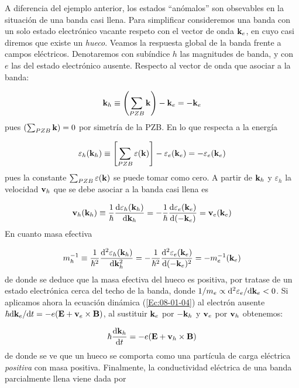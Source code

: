 A diferencia del ejemplo anterior, los estados ``anómalos'' son obsevables en la situación de una banda casi llena. Para simplificar consideremos una banda con un solo estado electrónico vacante respeto con el vector de onda $\mathbf{k}_e$, en cuyo casi diremos que existe un \textit{hueco}. Veamos la respuesta global de la banda frente a campos eléctricos. Denotaremos con subíndice $h$ las magnitudes de banda, y con $e$ las del estado electrónico ausente. Respecto al vector de onda que asociar a la banda:

\begin{equation}
	\mathbf{k}_h \equiv \left( \sum_{PZB} \mathbf{k} \right) - \mathbf{k}_e = - \mathbf{k}_e
\end{equation}
pues $\left( \sum_{PZB} \mathbf{k} \right) =0$ por simetría de la PZB. En lo que respecta a la energía 

\begin{equation}
	\varepsilon_h (\mathbf{k}_h) \equiv \left[ \sum_{PZB} \varepsilon(\mathbf{k})  \right] - \varepsilon_e (\mathbf{k}_e) = - \varepsilon_e (\mathbf{k}_e)
\end{equation}
pues la constante $\sum_{PZB} \varepsilon(\mathbf{k})$ se puede tomar como cero. A partir de $\mathbf{k}_h$ y $\varepsilon_h$ la velocidad $\mathbf{v}_h$ que se debe asociar a la banda casi llena es 
 
\begin{equation}
	\mathbf{v}_h (\mathbf{k}_h) \equiv \frac{1}{\hbar} \frac{\mathrm{d} \varepsilon_h (\mathbf{k}_h)}{\mathrm{d} \mathbf{k}_h} = - \frac{1}{\hbar} \frac{\mathrm{d} \varepsilon_e (\mathbf{k}_e)}{\mathrm{d} (-\mathbf{k}_e)} = \mathbf{v}_e (\mathbf{k}_e)
\end{equation}
En cuanto masa efectiva

\begin{equation}
	m_h^{-1} \equiv \frac{1}{\hbar^2} \frac{\mathrm{d} ^2\varepsilon_h (\mathbf{k}_h)}{\mathrm{d} \mathbf{k}_h^2} = - \frac{1}{\hbar^2} \frac{\mathrm{d} ^2\varepsilon_e (\mathbf{k}_e)}{\mathrm{d} (-\mathbf{k}_e)^2} = - m_e^{-1}(\mathbf{k}_e)
\end{equation}
de donde se deduce que la masa efectiva del hueco es positiva, por tratase de un estado electrónica cerca del techo de la banda, donde $1/m_e \propto \mathrm{d}^2 \varepsilon_e / \mathrm{d} \mathbf{k}_e <0$. Si aplicamos ahora la ecuación dinámica (\ref{Ec:08-01-04}) al electrón ausente $\hbar \mathrm{d} \mathbf{k}_e / \mathrm{d} t = - e (\mathbf{E} + \mathbf{v}_e \times \mathbf{B})$, al sustituir $\mathbf{k}_e$ por $-\mathbf{k}_h$ y $\mathbf{v}_e$ por $\mathbf{v}_h$ obtenemos:

\begin{equation}
	\hbar \frac{\mathrm{d} \mathbf{k}_h}{\mathrm{d} t} = - e (\mathbf{E} + \mathbf{v}_h \times \mathbf{B})
\end{equation}
de donde se ve que un hueco se comporta como una partícula de carga eléctrica \textit{positiva} con masa positiva. Finalmente, la conductividad eléctrica de una banda parcialmente llena viene dada por

